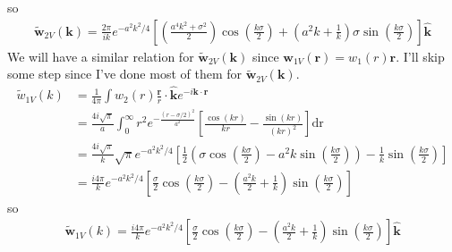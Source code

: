 \documentclass[letterpaper,twocolumn,amsmath,amssymb,prb]{revtex4-1}
\newcommand{\rr}{\textbf{r}}
\newcommand{\kk}{\textbf{k}}
\begin{document}
\begin{widetext}
so
\begin{align}
  \tilde{\mathbf{w}}_{2V}(\kk) = \frac{2 \pi}{ik}e^{-a^2k^2/4}\left[ \left(\frac{a^4k^2 +
      \sigma^2}{2} \right) \cos\left(\frac{k\sigma}{2}\right) +
    \left(a^2k + \frac{1}{k} \right)\sigma \sin\left(\frac{k\sigma}{2}\right)
    \right] \mathbf{\hat{k}}
\end{align}
We will have a similar relation for $\tilde{\mathbf{w}}_{2V}(\kk)$
since $\mathbf{w}_{1V}(\rr) = w_1(r)\rr$.  I'll skip some step since
I've done most of them for $\tilde{\mathbf{w}}_{2V}(\kk)$.
\begin{align}
  \tilde{w}_{1V}(k) &= \frac{1}{4\pi}\int w_2(r)\frac{\rr}{r} \cdot \mathbf{\hat{k}} e^{-i\kk \cdot
  \rr} \\
  &= \frac{4i \sqrt{\pi}}{a}\int_0^\infty r^2
  e^{-\frac{(r-\sigma/2)^2}{a^2}} \left[ \frac{\cos(kr)}{kr}
    - \frac{\sin(kr)}{(kr)^2}\right] \mathrm{dr} \\
  &= \frac{4i \sqrt{\pi}}{k} \sqrt{\pi}e^{-a^2k^2/4} \left[
    \frac{1}{2} \left( \sigma \cos\left(\frac{k\sigma}{2}\right) - a^2k
    \sin\left(\frac{k\sigma}{2}\right) \right) -\frac{1}{k}
    \sin\left(\frac{k\sigma}{2}\right) \right] \\
  &= \frac{i4 \pi}{k} e^{-a^2k^2/4} \left[
    \frac{\sigma}{2} \cos\left(\frac{k\sigma}{2}\right) - \left( \frac{a^2k}{2}
    + \frac{1}{k} \right) \sin\left(\frac{k\sigma}{2}\right) \right]
\end{align}
so
\begin{align}
  \mathbf{\tilde{w}}_{1V}(k)= \frac{i4 \pi}{k} e^{-a^2k^2/4} \left[
    \frac{\sigma}{2} \cos\left(\frac{k\sigma}{2}\right) - \left( \frac{a^2k}{2}
    + \frac{1}{k} \right) \sin\left(\frac{k\sigma}{2}\right) \right]
  \mathbf{\hat{k}}
\end{align}
\end{widetext}

\end{document}
